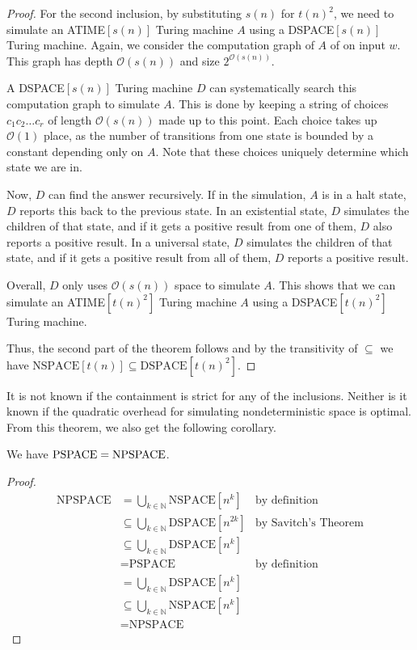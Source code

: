\begin{proof}
    \vspace{5mm}
    
    \sloppy For the second inclusion, by substituting $s(n)$ for $t(n)^2$, we need to simulate an ATIME$[s(n)]$ Turing machine $A$ using a DSPACE$[s(n)]$ Turing machine.
    Again, we consider the computation graph of $A$ of on input $w$.
    This graph has depth $\mathcal{O}(s(n))$ and size $2^{\mathcal{O}(s(n))}$.

    A DSPACE$[s(n)]$ Turing machine $D$ can systematically search this computation graph to simulate $A$.
    This is done by keeping a string of choices $c_{1}c_{2}\dots c_r$ of length $\mathcal{O}(s(n))$ made up to this point.
    Each choice takes up $\mathcal{O}(1)$ place, as the number of transitions from one state is bounded by a constant depending only on $A$.
    Note that these choices uniquely determine which state we are in.

    Now, $D$ can find the answer recursively.
    If in the simulation, $A$ is in a halt state, $D$ reports this back to the previous state.
    In an existential state, $D$ simulates the children of that state, and if it gets a positive result from one of them, $D$ also reports a positive result.
    In a universal state, $D$ simulates the children of that state, and if it gets a positive result from all of them, $D$ reports a positive result.

    Overall, $D$ only uses $\mathcal{O}(s(n))$ space to simulate $A$.
    This shows that we can simulate an ATIME$[t(n)^2]$ Turing machine $A$ using a DSPACE$[t(n)^2]$ Turing machine.

    Thus, the second part of the theorem follows and by the transitivity of $\subseteq$ we have $\text{NSPACE}[t(n)] \subseteq \text{DSPACE}[t(n)^2]$.
\end{proof}

It is not known if the containment is strict for any of the inclusions.
Neither is it known if the quadratic overhead for simulating nondeterministic space is optimal.
From this theorem, we also get the following corollary.

\begin{corollary}
    We have $\text{\upshape PSPACE} = \text{\upshape NPSPACE}$.
\end{corollary}

\begin{proof}
    \begin{align*}
        \text{NPSPACE} &= \bigcup_{k \in \mathbb{N}}\text{NSPACE}[n^k] & \text{by definition} \\
        &\subseteq \bigcup_{k\in \mathbb{N}}\text{DSPACE}[n^{2k}] & \text{by Savitch's Theorem} \\
        &\subseteq \bigcup_{k\in \mathbb{N}}\text{DSPACE}[n^{k}] \\
        &= \text{PSPACE} & \text{by definition} \\
        &= \bigcup_{k\in \mathbb{N}}\text{DSPACE}[n^{k}] \\
        &\subseteq \bigcup_{k\in \mathbb{N}}\text{NSPACE}[n^{k}] \\
        &= \text{NPSPACE}
    \end{align*}
\end{proof}


